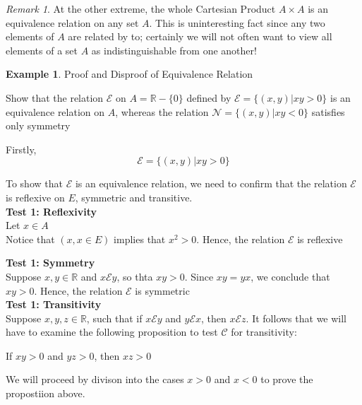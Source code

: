 \documentclass{book}
\theoremstyle{definition}
\newtheorem{example}{Example}[definition]
\theoremstyle{remark}
\newtheorem{remark}{Remark}
\newcommand{\bb}[1]{\mathbb{#1}}
\newcommand{\cc}[1]{\mathcal{#1}}
\begin{document}
    \begin{remark}
        At the other extreme, the whole Cartesian Product $A \times A$ is an equivalence relation on any set $A$. This is uninteresting fact since any two elements of $A$ are related by to; certainly we will not often want to view all elements of a set $A$ as indistinguishable from one another!\textbf{}
    \end{remark}
    
    
    \begin{example}
    Proof and Disproof of Equivalence Relation \\
        \begin{tcolorbox}
            Show that the relation $\cc{E}$ on $A = \bb{R} - \{0 \}$ defined by $\cc{E} = \{ (x,y) | xy > 0 \}$ is an equivalence relation on $A$, whereas the relation $\cc{N} = \{ (x,y) | xy < 0 \}$ satisfies only symmetry
        \end{tcolorbox}
        
            
        Firstly, \\
            \begin{equation*}
                \cc{E} = \{ (x,y) | xy > 0 \}
            \end{equation*}
        
        To show that $\cc{E}$ is an equivalence relation, we need to confirm that the relation $\cc{E}$ is reflexive on $E$, symmetric and transitive. \\

            \textbf{Test 1: Reflexivity } \\
                Let $x \in A$ \\
                Notice that $(x,x \in E)$ implies that $x^2 > 0$. Hence, the relation $\cc{E}$ is reflexive
            
            \textbf{Test 1: Symmetry } \\
                Suppose $x,y \in \bb{R}$ and $x \cc{E} y$, so thta $xy >0$. Since $xy = yx$, we conclude that $xy > 0$. Hence, the relation $\cc{E}$ is symmetric \\
            
            \textbf{Test 1: Transitivity } \\
                 Suppose $x,y,z \in \bb{R}$, such that if $x \cc{E} y$ and $y \cc{E} x$, then $x \cc{E} z$. It follows that we will have to examine the following proposition to test $\cc{C}$ for transitivity:
                    \begin{center}
                        If $xy > 0$ and $yz > 0$, then $xz > 0$
                    \end{center}
                We will proceed by divison into the cases $x>0$ and $x<0$ to prove the propostiion above. \\
                

\end{example}
\end{document}
